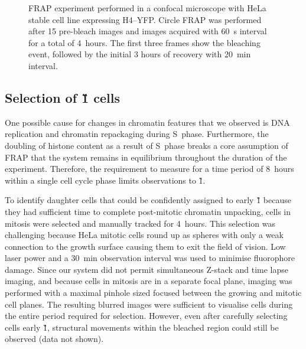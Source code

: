     \begin{figure}
      \centering
        {
          FRAP experiment performed in a confocal microscope with HeLa
          stable cell line expressing H4--YFP.  Circle FRAP was
          performed after 15 pre-bleach images and images acquired
          with \SI{60}{\second} interval for a total of 4~hours.
          The first three
          frames show the bleaching event, followed by the initial 3
          hours of recovery with \SI{20}{\minute} interval.
        }
      \label{fig:kill-frap:frap-spot-movement}
    \end{figure}

    \subsection{Selection of \G1{} cells}

    One possible cause for changes in chromatin features that we observed
    is DNA replication and chromatin repackaging during S~phase.
    Furthermore, the doubling of histone content as a result of S~phase breaks
    a core assumption of FRAP that the system remains in equilibrium
    throughout the duration of the experiment.
    Therefore, the requirement to measure for a time period of 8~hours
    within a single cell cycle phase limits observations to \G1{}.

    To identify daughter cells that could be confidently assigned to early \G1{}
    because they had sufficient time to complete
    post-mitotic chromatin unpacking,
    cells in mitosis were selected and manually tracked for 4~hours.
    This selection was challenging because HeLa mitotic cells round up
    as spheres with only a weak connection to the growth surface
    causing them to exit the field of vision.
    Low laser power and a \SI{30}{\minute} observation interval
    was used to minimise fluorophore damage.
    Since our system did not permit simultaneous
    Z-stack and time lapse imaging,
    and because cells in mitosis are in a separate focal plane,
    imaging was performed with a maximal pinhole sized focused
    between the growing and mitotic cell planes.
    The resulting blurred images were sufficient to visualise cells during
    the entire period required for selection.
    However, even after carefully selecting cells early \G1{},
    structural movements within the bleached region could
    still be observed (data not shown).

